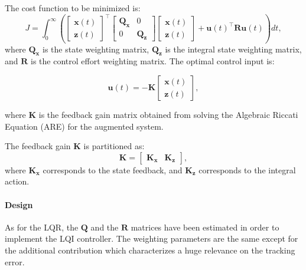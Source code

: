 The cost function to be minimized is:
\begin{equation}
    J = \int_0^\infty \left(
    \begin{bmatrix}
            \mathbf{x}(t) \\
            \mathbf{z}(t)
        \end{bmatrix}^\top
    \begin{bmatrix}
            \mathbf{Q_x} & 0            \\
            0            & \mathbf{Q_z}
        \end{bmatrix}
    \begin{bmatrix}
            \mathbf{x}(t) \\
            \mathbf{z}(t)
        \end{bmatrix}
    + \mathbf{u}(t)^\top \mathbf{R} \mathbf{u}(t)
    \right) dt,
\end{equation}
where $\mathbf{Q_x}$ is the state weighting matrix, $\mathbf{Q_z}$ is the integral state weighting matrix, and $\mathbf{R}$ is the control effort weighting matrix. The optimal control input is:

\begin{equation}
    \mathbf{u}(t) = -\mathbf{K}
    \begin{bmatrix}
        \mathbf{x}(t) \\
        \mathbf{z}(t)
    \end{bmatrix},
\end{equation}

where $\mathbf{K}$ is the feedback gain matrix obtained from solving the Algebraic Riccati Equation (ARE) for the augmented system.

The feedback gain $\mathbf{K}$ is partitioned as:
\begin{equation}
    \mathbf{K} =
    \begin{bmatrix}
        \mathbf{K_x} & \mathbf{K_z}
    \end{bmatrix},
\end{equation}
where $\mathbf{K_x}$ corresponds to the state feedback, and $\mathbf{K_z}$ corresponds to the integral action.

\paragraph{Design} As for the LQR, the $\mathbf{Q}$ and the $\mathbf{R}$ matrices have been estimated in order to implement the LQI controller. The weighting parameters are the same except for the additional contribution which characterizes a huge relevance on the tracking error.

